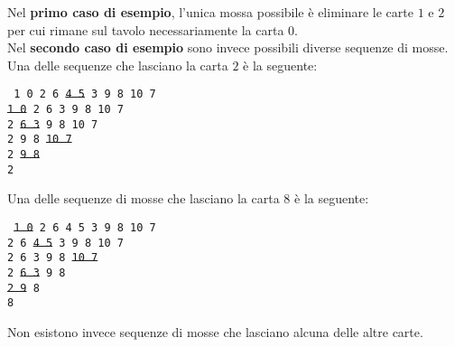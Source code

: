 \Examples

\begin{example}
%
%
\end{example}



\Explanation

Nel \textbf{primo caso di esempio}, l'unica mossa possibile \`e eliminare le carte $1$ e $2$ per cui rimane sul tavolo necessariamente la carta $0$.\\[2mm]
Nel \textbf{secondo caso di esempio} sono invece possibili diverse sequenze di mosse. Una delle sequenze che lasciano la carta $2$ \`e la seguente:
\begin{center}
\tt
1 0 2 6 \sout{4 5} 3 9 8 10 7 \\
\sout{1 0} 2 6 3 9 8 10 7 \\
2 \sout{6 3} 9 8 10 7 \\
2 9 8 \sout{10 7} \\
2 \sout{9 8} \\
2
\end{center}
Una delle sequenze di mosse che lasciano la carta $8$ \`e la seguente:
\begin{center}
\tt
\sout{1 0} 2 6 4 5 3 9 8 10 7 \\
2 6 \sout{4 5} 3 9 8 10 7 \\
2 6 3 9 8 \sout{10 7} \\
2 \sout{6 3} 9 8 \\
\sout{2 9} 8 \\
8
\end{center}
Non esistono invece sequenze di mosse che lasciano alcuna delle altre carte.


%    
